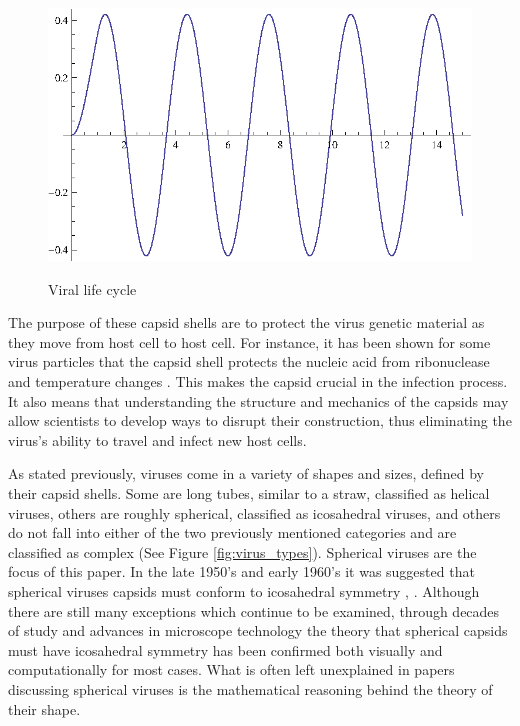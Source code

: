 \documentclass[12pt,letter]{article}
\begin{document}
\begin{figure}[h]
	\caption{Viral life cycle}
	\centering
	\includegraphics{place_holder.eps}
	\label{fig:life_cycle}
\end{figure}
	

The purpose of these capsid shells are to protect the virus genetic material as they move from host cell to host cell. For instance, it has been shown for some virus particles that the capsid shell protects the nucleic acid from ribonuclease and temperature changes \cite[p 5]{Caspar:1962}. This makes the capsid crucial in the infection process. It also means that understanding the structure and mechanics of the capsids may allow scientists to develop ways to disrupt their construction, thus eliminating the virus's ability to travel and infect new host cells. 

As stated previously, viruses come in a variety of shapes and sizes, defined by their capsid shells. Some are long tubes, similar to a straw, classified as helical viruses, others are roughly spherical, classified as icosahedral viruses, and others do not fall into either of the two previously mentioned categories and are classified as complex (See Figure \ref{fig:virus_types}). Spherical viruses are the focus of this paper. In the late 1950's and early 1960's it was suggested that spherical viruses capsids must conform to icosahedral symmetry \cite{Crick:1956}, \cite{Caspar:1962}. Although there are still many exceptions which continue to be examined, through decades of study and advances in microscope technology the theory that spherical capsids must have icosahedral symmetry has been confirmed both visually and computationally for most cases. What is often left unexplained in papers discussing spherical viruses is the mathematical reasoning behind the theory of their shape.
\end{document}
